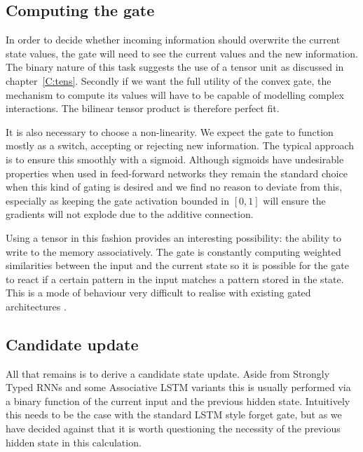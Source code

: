 \subsection{Computing the gate}
In order to decide whether incoming information should
overwrite the current state values, the gate will need to see the current values and the new information.
The binary nature of this task suggests
the use of a tensor unit as discussed in chapter~\ref{C:tens}. Secondly if we want the full utility of
the convex gate, the mechanism to compute its values will have to be capable of modelling complex interactions. 
The bilinear tensor product is therefore
perfect fit.

It is also necessary to choose a non-linearity. We expect the gate to function mostly as a switch,
accepting or rejecting new information. The
typical approach is to ensure this smoothly with a sigmoid. Although sigmoids have undesirable
properties when used in feed-forward networks \autocite{Glorot2010} they remain the standard choice
when this kind of gating is desired \autocite{VandenOord2016, Oord2016} and we find no reason to
deviate from this, especially as keeping the gate activation bounded in \([0,1]\) will ensure the
gradients will not explode due to the additive connection.

Using a tensor in this fashion provides an interesting possibility: the ability to write to the memory
associatively. The gate is constantly computing weighted similarities between
the input and the current state so it is possible for the gate to react if a certain pattern in the
input matches a pattern stored in the state. This is a mode of behaviour very difficult to realise
with existing gated architectures \autocite{Danihelka2016}.

\subsection{Candidate update}
All that remains is to derive a candidate state update. Aside from Strongly Typed RNNs \autocite{Balduzzi2016}
and some Associative LSTM variants \autocite{Danihelka2016} this is usually performed via
a binary function of the current input and the previous hidden state. Intuitively this needs to
be the case with the standard LSTM style forget gate, but as we have decided against that it is worth questioning
the necessity of the previous hidden state in this calculation.

